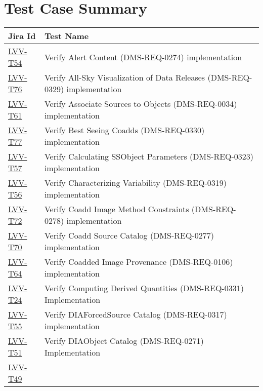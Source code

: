 \newpage
\hypertarget{test-case-summary}{%
\section{Test Case Summary}\label{test-case-summary}}

\begin{longtable}[]{@{}ll@{}}
\toprule
Jira Id & Test Name\tabularnewline
\midrule
\endhead
\protect\hyperlink{lvv-t54---verify-alert-content-dms-req-0274-implementation}{LVV-T54}
& Verify Alert Content (DMS-REQ-0274) implementation\tabularnewline
\protect\hyperlink{lvv-t76---verify-all-sky-visualization-of-data-releases-dms-req-0329-implementation}{LVV-T76}
& Verify All-Sky Visualization of Data Releases (DMS-REQ-0329)
implementation\tabularnewline
\protect\hyperlink{lvv-t61---verify-associate-sources-to-objects--dms-req-0034-implementation}{LVV-T61}
& Verify Associate Sources to Objects (DMS-REQ-0034)
implementation\tabularnewline
\protect\hyperlink{lvv-t77---verify-best-seeing-coadds-dms-req-0330-implementation}{LVV-T77}
& Verify Best Seeing Coadds (DMS-REQ-0330) implementation\tabularnewline
\protect\hyperlink{lvv-t57---verify-calculating-ssobject-parameters-dms-req-0323-implementation}{LVV-T57}
& Verify Calculating SSObject Parameters (DMS-REQ-0323)
implementation\tabularnewline
\protect\hyperlink{lvv-t56---verify-characterizing-variability-dms-req-0319-implementation}{LVV-T56}
& Verify Characterizing Variability (DMS-REQ-0319)
implementation\tabularnewline
\protect\hyperlink{lvv-t72---verify-coadd-image-method-constraints-dms-req-0278-implementation}{LVV-T72}
& Verify Coadd Image Method Constraints (DMS-REQ-0278)
implementation\tabularnewline
\protect\hyperlink{lvv-t70---verify-coadd-source-catalog-dms-req-0277-implementation}{LVV-T70}
& Verify Coadd Source Catalog (DMS-REQ-0277)
implementation\tabularnewline
\protect\hyperlink{lvv-t64---verify-coadded-image-provenance-dms-req-0106-implementation}{LVV-T64}
& Verify Coadded Image Provenance (DMS-REQ-0106)
implementation\tabularnewline
\protect\hyperlink{lvv-t24---verify-computing-derived-quantities-dms-req-0331-implementation}{LVV-T24}
& Verify Computing Derived Quantities (DMS-REQ-0331)
Implementation\tabularnewline
\protect\hyperlink{lvv-t55---verify-diaforcedsource-catalog-dms-req-0317-implementation}{LVV-T55}
& Verify DIAForcedSource Catalog (DMS-REQ-0317)
implementation\tabularnewline
\protect\hyperlink{lvv-t51---verify-diaobject-catalog-dms-req-0271-implementation}{LVV-T51}
& Verify DIAObject Catalog (DMS-REQ-0271) Implementation\tabularnewline
\protect\hyperlink{lvv-t49---verify-diasource-catalog-dms-req-0269-implementation}{LVV-T49}

\end{longtable}
